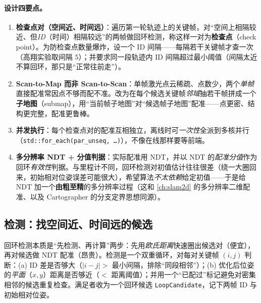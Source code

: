 \paragraph{设计四要点。}
\begin{enumerate}
  \item \textbf{检查点对（空间近、时间远）}：遍历第一轮轨迹上的关键帧，对“空间上相隔较近、但\emph{ID}（时间）相隔较远”的两帧做回环检测，称这样一对为\textbf{检查点}（check point）。为防检查点数量爆炸，设一个 ID 间隔——每隔若干关键帧才查一次（高翔实验取间隔 $5$）；并要求同一段轨迹内 ID 间隔超过最小阈值（间隔太近不算回环，那只是“正常往前走”）。
  \item \textbf{Scan-to-Map 而非 Scan-to-Scan}：单帧激光点云稀疏、点数少，两个\emph{单帧}直接配准常因点不够而配不准。改为在每个候选关键帧\emph{邻域}抽若干帧拼成一个\textbf{子地图}（submap），用“当前帧子地图”对“候选帧子地图”配准——点更密、结构更完整，配准更鲁棒。
  \item \textbf{并发执行}：每个检查点对的配准互相独立，离线时可\emph{一次性}全派到多核并行（\texttt{std::for\_each(par\_unseq,\,\ldots)}），不像在线那样要等前端。
  \item \textbf{多分辨率 NDT + 分值判据}：实际配准用 NDT，并以 NDT 的\emph{配准分值}作为回环\emph{有效性}判据。与里程计不同，回环检测对初值估计往往很差（绕一大圈回来，初始相对位姿误差可能很大），希望算法\emph{不太依赖}给定初值——于是给 NDT 加一个\textbf{由粗至精}的多分辨率过程（这和 \cref{ch:slam2d} 的多分辨率二维配准、以及 Cartographer 的分支定界思想同源）。
\end{enumerate}

\subsection{检测：找空间近、时间远的候选}
\label{sec:lidar-map-loop-detect}

回环检测本质是“先检测、再计算”两步：先用\emph{欧氏距离}快速圈出候选对（便宜），再对候选做 NDT 配准（昂贵）。检测是一个双重循环，对每对关键帧 $(i,j)$ 判断\cite{gao2023slamad}：(a) ID 差是否够大（$|i-j|>$ 最小间隔，排除“同段相邻”）；(b) 优化后位姿的\emph{平面}（$x,y$）距离是否够近（$<$ 距离阈值）；并用一个“已配过”标记避免对密集相邻的候选重复检查。满足者收为一个回环候选 \texttt{LoopCandidate}，记下两帧 ID 与初始相对位姿。

